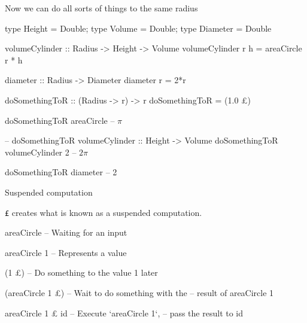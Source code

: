 \documentclass[ignorenonframetext,]{beamer}
\begin{document}
\begin{frame}[fragile]{Now we can do all sorts of things to the same
radius}

\begin{haskellcode}
type Height = Double; type Volume = Double; type Diameter = Double

volumeCylinder :: Radius -> Height -> Volume
volumeCylinder r h = areaCircle r * h

diameter :: Radius -> Diameter
diameter r = 2*r

doSomethingToR :: (Radius -> r) -> r
doSomethingToR = (1.0 £)
\end{haskellcode}

\pause

\begin{haskellcode}
doSomethingToR areaCircle       -- $\pi$

-- doSomethingToR volumeCylinder :: Height -> Volume
doSomethingToR volumeCylinder 2 -- $2\pi$

doSomethingToR diameter         -- 2
\end{haskellcode}

\end{frame}

\begin{frame}[fragile]{Suspended computation}

\texttt{£} creates what is known as a suspended computation.

\begin{haskellcode}
areaCircle -- Waiting for an input
\end{haskellcode}

\pause

\begin{haskellcode}
areaCircle 1 -- Represents a value
\end{haskellcode}

\pause

\begin{haskellcode}
(1 £) -- Do something to the value 1 later
\end{haskellcode}

\pause

\begin{haskellcode}
(areaCircle 1 £)  -- Wait to do something with the
                  -- result of areaCircle 1
\end{haskellcode}

\pause

\begin{haskellcode}
areaCircle 1 £ id -- Execute `areaCircle 1`,
                  -- pass the result to id
\end{haskellcode}

\end{frame}
\end{document}
